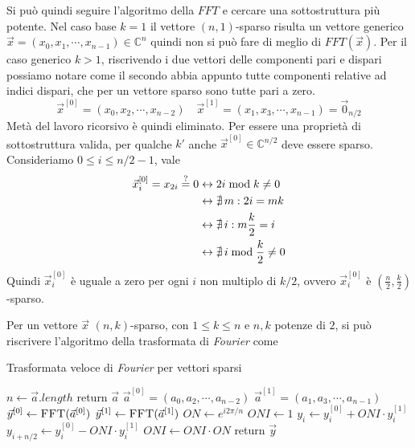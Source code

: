 Si può quindi seguire l'algoritmo della $FFT$ e cercare una sottostruttura più potente. Nel caso base $k=1$ il vettore $\left( n,1 \right)$-sparso risulta un vettore generico $\vec{x}=\left( x_0, x_1,\cdots, x _{n-1} \right) \in \mathbb{C}^n$ quindi non si può fare di meglio di $FFT\left( \vec{x} \right)$. Per il caso generico $k>1$, riscrivendo i due vettori delle componenti pari e dispari possiamo notare come il secondo abbia appunto tutte componenti relative ad indici dispari, che per un vettore sparso sono tutte pari a zero.
\begin{equation*}
    \vec{x}^{[0]}=\left( x_0, x_2,\cdots, x _{n-2} \right)
    \quad 
    \vec{x}^{[1]}=\left( x_1, x_3,\cdots, x _{n-1} \right) = \vec{0}_{n/2}
\end{equation*}
Metà del lavoro ricorsivo è quindi eliminato.
Per essere una proprietà di sottostruttura valida, per qualche $k'$ anche $\vec{x}^{[0]} \in \mathbb{C}^{n/2}$ deve essere sparso. Consideriamo $0 \leq i \leq n/2-1$, vale
\begin{align*}
    \vec{x}_i^{[0]} = x_{2i} \overset{?}{=} 0 
    & \leftrightarrow
    2i \bmod k \neq 0
    \\
    & \leftrightarrow
    \nexists \, m : 2i = mk
    \\
    & \leftrightarrow
    \nexists \, i : m\frac{k}{2} = i
    \\
    & \leftrightarrow
    \nexists \, i \bmod \frac{k}{2} \neq 0
\end{align*}
Quindi $\vec{x}_i^{[0]}$ è uguale a zero per ogni $i$ non multiplo di $k/2$, ovvero $\vec{x}_i^{[0]}$ è $\left( \frac{n}{2}, \frac{k}{2} \right)$-sparso.

Per un vettore $\vec{x}$ $(n,k)$-sparso, con $1 \leq k \leq n$ e $n,k$ potenze di $2$, si può riscrivere l'algoritmo della trasformata di \textit{Fourier} come

\begin{algorithm}[H]
\caption{Trasformata veloce di \textit{Fourier} per vettori sparsi}\label{alg:fftsparsa}
\begin{algorithmic}[1]
        \State $n \gets \vec{a}.length$
            \State return $\vec{a}$
        \EndIf
        \State $\vec{a}^{[0]}=\left( a_0, a_2,\cdots, a _{n-2} \right)$
        \label{alg:fft:a0}
        \State $\vec{a}^{[1]}=\left( a_1, a_3,\cdots, a _{n-1} \right)$
        \State $\vec{y}^{[0]} \gets \Call{FFT}{\vec{a}^{[0]}}$
        \State $\vec{y}^{[1]} \gets \Call{FFT}{\vec{a}^{[1]}}$
        \State $ON \gets e^{i 2 \pi/n}$   
        \State $ONI \gets 1$   
        \label{alg:fft:oni}
            \State $y_{i} \gets y_{i}^{[0]} + ONI \cdot y_i^{[1]}$
            \label{alg:fft:con}
            \State $y_{i+n/2} \gets y_{i}^{[0]} - ONI \cdot y_i^{[1]}$
            \State $ONI \gets ONI \cdot ON$
        \EndFor
        \State return $\vec{y}$
    \EndProcedure
\end{algorithmic}
\end{algorithm}

